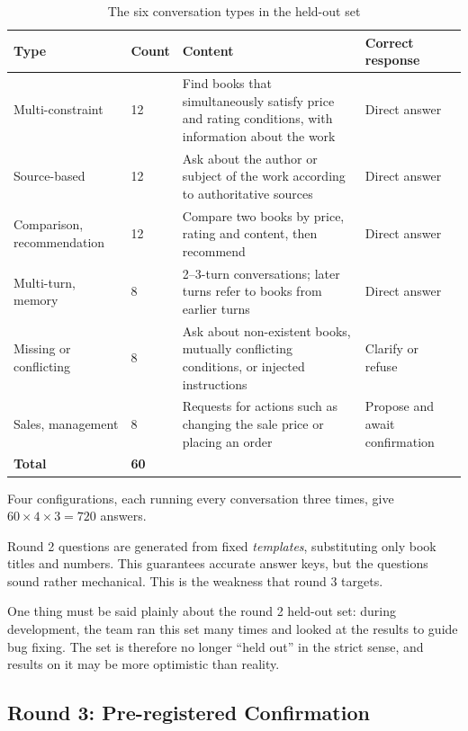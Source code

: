 \begin{table}[!htbp]
\caption{The six conversation types in the held-out set}
\label{tab:sau-loai}
\cobang
\begin{tabularx}{\linewidth}{P{3.3cm}C{1.2cm}YP{3.0cm}}
\toprule
\textbf{Type} & \textbf{Count} & \textbf{Content} & \textbf{Correct response}\\
\midrule
Multi-constraint & 12 & Find books that simultaneously satisfy price and rating conditions, with information about the work & Direct answer\\
Source-based & 12 & Ask about the author or subject of the work according to authoritative sources & Direct answer\\
Comparison, recommendation & 12 & Compare two books by price, rating and content, then recommend & Direct answer\\
Multi-turn, memory & 8 & 2--3-turn conversations; later turns refer to books from earlier turns & Direct answer\\
Missing or conflicting & 8 & Ask about non-existent books, mutually conflicting conditions, or injected instructions & Clarify or refuse\\
Sales, management & 8 & Requests for actions such as changing the sale price or placing an order & Propose and await confirmation\\
\midrule
\textbf{Total} & \textbf{60} & & \\
\bottomrule
\end{tabularx}
\end{table}

Four configurations, each running every conversation three times, give $60 \times 4 \times 3 = 720$ answers.

Round 2 questions are generated from fixed \emph{templates}, substituting only book titles and numbers. This guarantees accurate answer keys, but the questions sound rather mechanical. This is the weakness that round 3 targets.

One thing must be said plainly about the round 2 held-out set: during development, the team ran this set many times and looked at the results to guide bug fixing. The set is therefore no longer ``held out'' in the strict sense, and results on it may be more optimistic than reality.

\subsection{Round 3: Pre-registered Confirmation}
\label{sec:dang-ky-truoc}

